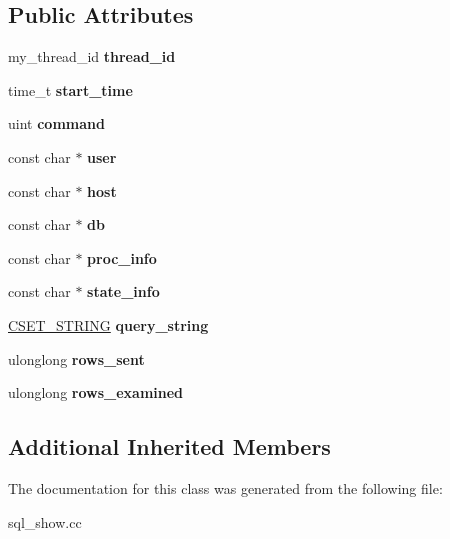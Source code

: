 \subsection*{Public Attributes}
\begin{DoxyCompactItemize}
\item 
\mbox{\label{classthread__info_ab447a21964d53567ccdbf3360ff4808a}} 
my\+\_\+thread\+\_\+id {\bfseries thread\+\_\+id}
\item 
\mbox{\label{classthread__info_aebf1c9b8420f19ec10d1ddedb4ff80f2}} 
time\+\_\+t {\bfseries start\+\_\+time}
\item 
\mbox{\label{classthread__info_a12bee86b07b9792636e1222fa6cf26da}} 
uint {\bfseries command}
\item 
\mbox{\label{classthread__info_a04d63281dc4e086ff201cccf5463186f}} 
const char $\ast$ {\bfseries user}
\item 
\mbox{\label{classthread__info_aa2a6609fbf5e3f4ca86dc57764988ce2}} 
const char $\ast$ {\bfseries host}
\item 
\mbox{\label{classthread__info_a384a6158610d781543aa5041eeaff8a9}} 
const char $\ast$ {\bfseries db}
\item 
\mbox{\label{classthread__info_a51f8f77816a1804a997b52149f24e066}} 
const char $\ast$ {\bfseries proc\+\_\+info}
\item 
\mbox{\label{classthread__info_aaa46f4ef57af7403f37f29df1942ecd4}} 
const char $\ast$ {\bfseries state\+\_\+info}
\item 
\mbox{\label{classthread__info_ac8776346d5578e524c42d6f7ec6c5364}} 
\mbox{\hyperlink{classCSET__STRING}{C\+S\+E\+T\+\_\+\+S\+T\+R\+I\+NG}} {\bfseries query\+\_\+string}
\item 
\mbox{\label{classthread__info_a49ef4fc45616993a380d4ba5e2f1677e}} 
ulonglong {\bfseries rows\+\_\+sent}
\item 
\mbox{\label{classthread__info_a97ecfa07bbfea4535e81e357dab1c5b0}} 
ulonglong {\bfseries rows\+\_\+examined}
\end{DoxyCompactItemize}
\subsection*{Additional Inherited Members}


The documentation for this class was generated from the following file\+:\begin{DoxyCompactItemize}
\item 
sql\+\_\+show.\+cc\end{DoxyCompactItemize}
